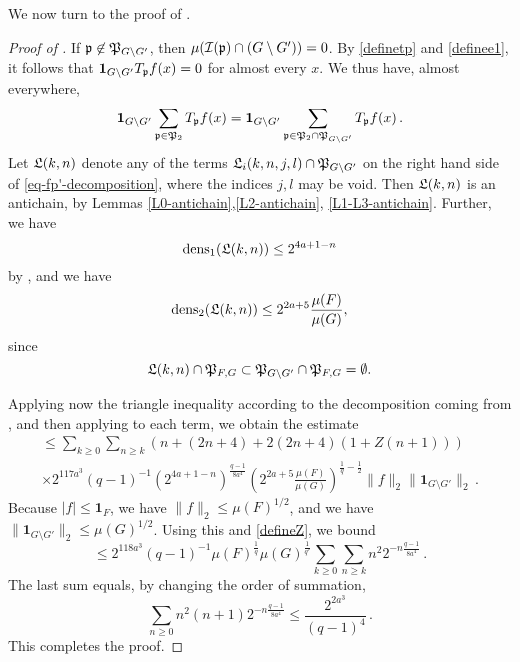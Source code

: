 We now turn to the proof of .
\begin{proof}[Proof of ]
    \leanok
    If ${\mathfrak p} \not\in {\mathfrak P}_{G \setminus G'}$, then $\mu({\mathcal{I}}({\mathfrak p}) \cap (G \setminus G')) = 0$. By \eqref{definetp} and \eqref{definee1}, it follows that
    $\mathbf{1}_{G \setminus G'} T_{{\mathfrak p}}f(x) = 0$ for almost every $x$. We thus have, almost everywhere,
    $$
        \mathbf{1}_{G\setminus G'} \sum_{{\mathfrak p} \in {\mathfrak P}_2} T_{{\mathfrak p}}f(x) = \mathbf{1}_{G\setminus G'} \sum_{{\mathfrak p} \in {\mathfrak P}_2 \cap {\mathfrak P}_{G \setminus G'}} T_{{\mathfrak p}}f(x)\,.
    $$
    Let ${\mathfrak L}(k,n)$ denote any of the terms ${\mathfrak L}_i(k,n,j,l) \cap {\mathfrak P}_{G \setminus G'}$ on the right hand side of \eqref{eq-fp'-decomposition}, where the indices $j, l$ may be void. Then ${\mathfrak L}(k,n)$ is an antichain, by Lemmas \ref{L0-antichain},\ref{L2-antichain}, \ref{L1-L3-antichain}. Further, we have
    \begin{equation*}
    \operatorname{\operatorname{dens}}_1({\mathfrak L}(k,n)) \le 2^{4a+1 - n}
    \end{equation*}
    by , and we have
    \begin{equation*}
     \operatorname{\operatorname{dens}}_2({\mathfrak L}(k,n)) \le 2^{2a+5} \frac{\mu(F)}{\mu(G)},
     \end{equation*}
     since
     \begin{equation*}
     {\mathfrak L}(k,n) \cap {\mathfrak P}_{F,G} \subset {\mathfrak P}_{G \setminus G'} \cap {\mathfrak P}_{F, G} = \emptyset.
     \end{equation*}

    Applying now the triangle inequality according to the decomposition coming from , and then applying  to each term, we obtain the estimate
    \begin{multline*}
        \le \sum_{k \ge 0} \sum_{n \ge k} (n + (2n+4) + 2(2n+4) (1+Z(n+1))) \\
        \times 2^{117a^3}(q-1)^{-1} (2^{4a+1-n})^{\frac{q-1}{8a^4}} (2^{2a+5} \frac{\mu(F)}{\mu(G)})^{\frac{1}{q} - \frac{1}{2}} \|f\|_2\|\mathbf{1}_{G\setminus G'}\|_2\,.
    \end{multline*}
    Because $|f| \le \mathbf{1}_F$, we have $\|f\|_2 \le \mu(F)^{1/2}$, and we have $\|\mathbf{1}_{G\setminus G'}\|_2 \le \mu(G)^{1/2}$. Using this and \eqref{defineZ}, we bound
    $$
        \le 2^{118a^3} (q - 1)^{-1} \mu(F)^{\frac{1}{q}} \mu(G)^{\frac{1}{q'}} \sum_{k \ge 0} \sum_{n \ge k} n^2 2^{-n\frac{q-1}{8a^4}}\,.
    $$
    The last sum equals, by changing the order of summation,
    $$
        \sum_{n \ge 0} n^2(n+1) 2^{-n\frac{q-1}{8a^4}} \le \frac{2^{2a^3}}{(q-1)^4}\,.
    $$
    This completes the proof.
\end{proof}

